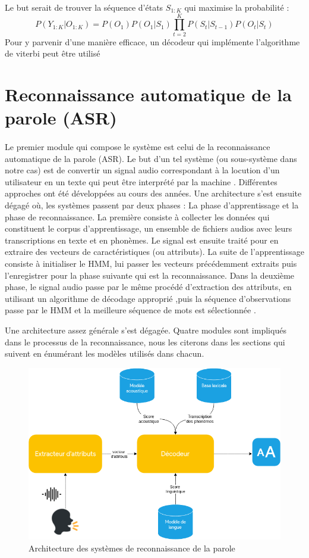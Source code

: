 	\par
	\newpage
	Le but serait de trouver la séquence d'états $S_{1:K}$ qui maximise la probabilité \cite{hmm_intro} : 
	\begin{equation}
		P(Y_{1:K} | O_{1:K}) = P(O_1)P(O_1|S_1)\prod_{t=2}^{K}P(S_t|S_{t-1})P(O_t|S_t) 
	\end{equation}
	Pour y parvenir d'une manière efficace, un décodeur qui implémente l'algorithme de viterbi peut être utilisé \cite{viterbi,viterbi_hmm}

\section{Reconnaissance automatique de la parole (ASR)}
	\paragraph{}
	Le premier module qui compose le système est celui de la reconnaissance automatique de la parole (ASR). Le but d'un tel système (ou sous-système dans notre cas) est de convertir un signal audio correspondant à la locution d'un utilisateur en un texte qui peut être interprété par la machine \cite{asr_definition}. Différentes approches ont été développées au cours des années. Une architecture s'est ensuite dégagé où, les systèmes passent par deux phases : La phase d'apprentissage et la phase de reconnaissance. La première consiste à collecter les données qui constituent le corpus d'apprentissage, un ensemble de fichiers audios avec leurs transcriptions en texte et en phonèmes. Le signal est ensuite traité pour en extraire des vecteurs de caractéristiques (ou attributs). La suite de l'apprentissage consiste à initialiser le HMM, lui passer les vecteurs précédemment extraits puis l'enregistrer pour la phase suivante qui est la reconnaissance. Dans la deuxième phase, le signal audio passe par le même procédé d'extraction des attributs, en utilisant un algorithme de décodage approprié \cite{viterbi_hmm},puis la séquence d'observations passe par le HMM et la meilleure séquence de mots est sélectionnée \cite{speech_reco_Yu2015}.
	\par Une architecture assez générale s'est dégagée. Quatre modules sont impliqués dans le processus de la reconnaissance, nous les citerons dans les sections qui suivent en énumérant les modèles utilisés dans chacun.
	
	\begin{figure}[H]
		\centering
		\label{ASRSchema}
		\includegraphics[width=0.60\linewidth]{images/ASR/schema.png}
		\caption{Architecture des systèmes de reconnaissance de la parole \cite{speech_reco_Yu2015}}
	\end{figure}
	
